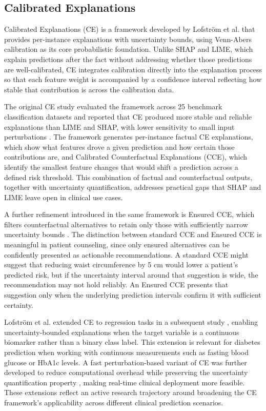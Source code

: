 \subsection{Calibrated Explanations}

Calibrated Explanations (CE) is a framework developed by Lofstr\"om et al. \cite{lofstrom_ce_2024} that provides per-instance explanations with uncertainty bounds, using Venn-Abers calibration as its core probabilistic foundation. Unlike SHAP and LIME, which explain predictions after the fact without addressing whether those predictions are well-calibrated, CE integrates calibration directly into the explanation process so that each feature weight is accompanied by a confidence interval reflecting how stable that contribution is across the calibration data.

The original CE study evaluated the framework across 25 benchmark classification datasets and reported that CE produced more stable and reliable explanations than LIME and SHAP, with lower sensitivity to small input perturbations \cite{lofstrom_ce_2024}. The framework generates per-instance factual CE explanations, which show what features drove a given prediction and how certain those contributions are, and Calibrated Counterfactual Explanations (CCE), which identify the smallest feature changes that would shift a prediction across a defined risk threshold. This combination of factual and counterfactual outputs, together with uncertainty quantification, addresses practical gaps that SHAP and LIME leave open in clinical use cases.

A further refinement introduced in the same framework is Ensured CCE, which filters counterfactual alternatives to retain only those with sufficiently narrow uncertainty bounds \cite{lofstrom_ce_2024}. The distinction between standard CCE and Ensured CCE is meaningful in patient counseling, since only ensured alternatives can be confidently presented as actionable recommendations. A standard CCE might suggest that reducing waist circumference by 5 cm would lower a patient's predicted risk, but if the uncertainty interval around that suggestion is wide, the recommendation may not hold reliably. An Ensured CCE presents that suggestion only when the underlying prediction intervals confirm it with sufficient certainty.

Lofstr\"om et al. extended CE to regression tasks in a subsequent study \cite{lofstrom_regression_2025}, enabling uncertainty-bounded explanations when the target variable is a continuous biomarker rather than a binary class label. This extension is relevant for diabetes prediction when working with continuous measurements such as fasting blood glucose or HbA1c levels. A fast perturbation-based variant of CE was further developed to reduce computational overhead while preserving the uncertainty quantification property \cite{lofstrom_fast_ce_2026}, making real-time clinical deployment more feasible. These extensions reflect an active research trajectory around broadening the CE framework's applicability across different clinical prediction scenarios.


